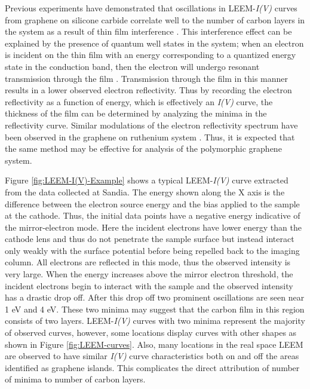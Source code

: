 Previous experiments have demonstrated that oscillations in LEEM-\textit{I(V)} curves from graphene on silicone carbide correlate well to the number of carbon layers in the system as a result of thin film interference \cite{hibino-prb-g-sic}. This interference effect can be explained by the presence of quantum well states in the system; when an electron is incident on the thin film with an energy corresponding to a quantized energy state in the conduction band, then the electron will undergo resonant transmission through the film \cite{hibino-prb-g-sic, QSE}.  Transmission through the film in this manner results in a lower observed electron reflectivity. Thus by recording the electron reflectivity as a function of energy, which is effectively an \textit{I(V)} curve, the thickness of the film can be determined by analyzing the minima in the reflectivity curve. Similar modulations of the electron reflectivity spectrum have been observed in the graphene on ruthenium system \cite{sutterleem}. Thus, it is expected that the same method may be effective for analysis of the polymorphic graphene system.

Figure \ref{fig:LEEM-I(V)-Example} shows a typical LEEM-\textit{I(V)} curve extracted from the data collected at Sandia. The energy shown along the X axis is the difference between the electron source energy and the bias applied to the sample at the cathode. Thus, the initial data points have a negative energy indicative of the mirror-electron mode. Here the incident electrons have lower energy than the cathode lens and thus do not penetrate the sample surface but instead interact only weakly with the surface potential before being repelled back to the imaging column. All electrons are reflected in this mode, thus the observed intensity is very large. When the energy increases above the mirror electron threshold, the incident electrons begin to interact with the sample and the observed intensity has a drastic drop off. After this drop off two prominent oscillations are seen near 1 eV and 4 eV. These two minima may suggest that the carbon film in this region consists of two layers. LEEM-\textit{I(V)} curves with two minima represent the majority of observed curves, however, some locations display curves with other shapes as shown in Figure \ref{fig:LEEM-curves}. Also, many locations in the real space LEEM are observed to have similar \textit{I(V)} curve characteristics both on and off the areas identified as graphene islands. This complicates the direct attribution of number of minima to number of carbon layers.

